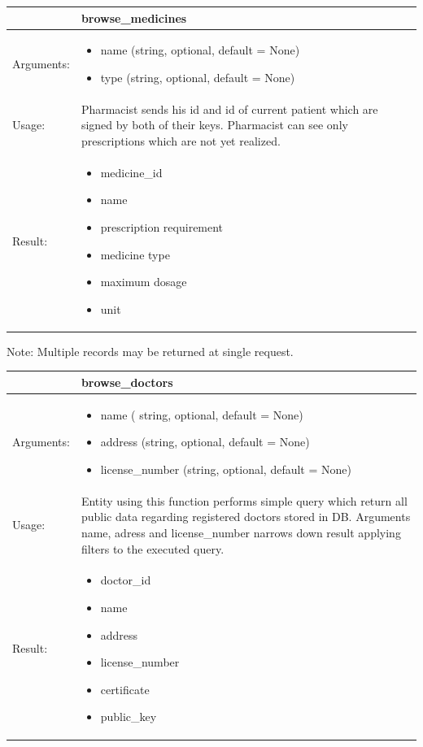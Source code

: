     \begin{longtable}{| p{6cm} | p{7.75cm} |}
    \hline
     & browse\_medicines \\ \hline
    Arguments: &  \begin{itemize}
    \item name (string, optional, default = None)
    \item type (string, optional, default = None)
	\end{itemize}        \\ \hline
    Usage: & Pharmacist sends his id and id of current patient which are signed by both of their keys. Pharmacist can see only prescriptions which are not yet realized. \\ \hline
    Result: & \begin{itemize}
    	\item medicine\_id
    	\item name
    	\item prescription requirement
    	\item medicine type
    	\item maximum dosage
    	\item unit
	\end{itemize}     \\ \hline	
    \end{longtable}

Note: Multiple records may be returned at single request.
    \begin{longtable}{| p{6cm} | p{7.75cm} |}
    \hline
     & browse\_doctors \\ \hline
    Arguments: &  \begin{itemize}
    	\item name ( string, optional, default = None)
		\item address (string, optional, default = None)
		\item license\_number (string, optional, default = None)

	\end{itemize}     \\ \hline
    Usage: & Entity using this function performs simple query which return all public data regarding registered doctors stored in DB. Arguments name, adress and license\_number narrows down result applying filters to the executed query. \\ \hline
    Result: & \begin{itemize}
    	\item doctor\_id
		\item name
		\item address
		\item license\_number
		\item certificate
		\item public\_key
	\end{itemize}     \\ \hline	
    \end{longtable}

